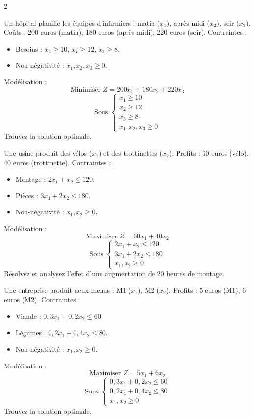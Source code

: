 \begin{multicols}{2}
\begin{exo}
	Un hôpital planifie les équipes d'infirmiers : matin (\(x_1\)), après-midi (\(x_2\)), soir (\(x_3\)). Coûts : 200 euros (matin), 180 euros (après-midi), 220 euros (soir). Contraintes :
	\begin{itemize}
		\item Besoins : \(x_1 \geq 10\), \(x_2 \geq 12\), \(x_3 \geq 8\).
		\item Non-négativité : \(x_1, x_2, x_3 \geq 0\).
	\end{itemize}
	Modélisation :
	\[
	\text{Minimiser } Z = 200x_1 + 180x_2 + 220x_3
	\]
	\[
	\text{Sous } \begin{cases}
	x_1 \geq 10 \\
	x_2 \geq 12 \\
	x_3 \geq 8 \\
	x_1, x_2, x_3 \geq 0
	\end{cases}
	\]
	Trouvez la solution optimale.
\end{exo}

\begin{exo}
	Une usine produit des vélos (\(x_1\)) et des trottinettes (\(x_2\)). Profits : 60 euros (vélo), 40 euros (trottinette). Contraintes :
	\begin{itemize}
		\item Montage : \(2x_1 + x_2 \leq 120\).
		\item Pièces : \(3x_1 + 2x_2 \leq 180\).
		\item Non-négativité : \(x_1, x_2 \geq 0\).
	\end{itemize}
	Modélisation :
	\[
	\text{Maximiser } Z = 60x_1 + 40x_2
	\]
	\[
	\text{Sous } \begin{cases}
	2x_1 + x_2 \leq 120 \\
	3x_1 + 2x_2 \leq 180 \\
	x_1, x_2 \geq 0
	\end{cases}
	\]
	Résolvez et analysez l'effet d'une augmentation de 20 heures de montage.
\end{exo}

\begin{exo}
	Une entreprise produit deux menus : M1 (\(x_1\)), M2 (\(x_2\)). Profits : 5 euros (M1), 6 euros (M2). Contraintes :
	\begin{itemize}
		\item Viande : \(0,3x_1 + 0,2x_2 \leq 60\).
		\item Légumes : \(0,2x_1 + 0,4x_2 \leq 80\).
		\item Non-négativité : \(x_1, x_2 \geq 0\).
	\end{itemize}
	Modélisation :
	\[
	\text{Maximiser } Z = 5x_1 + 6x_2
	\]
	\[
	\text{Sous } \begin{cases}
	0,3x_1 + 0,2x_2 \leq 60 \\
	0,2x_1 + 0,4x_2 \leq 80 \\
	x_1, x_2 \geq 0
	\end{cases}
	\]
	Trouvez la solution optimale.
\end{exo}


\end{multicols}
